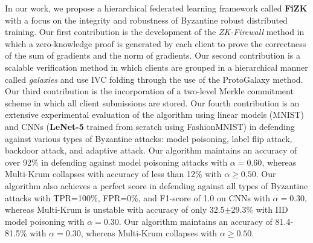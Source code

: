 \documentclass[10pt,twocolumn,letterpaper]{article}
\begin{document}
In our work, we propose a hierarchical federated learning framework called \textbf{FiZK} with a focus on the integrity and robustness of Byzantine robust distributed training. Our first contribution is the development of the \textit{ZK-Firewall} method in which a zero-knowledge proof is generated by each client to prove the correctness of the sum of gradients and the norm of gradients. Our second contribution is a scalable verification method in which clients are grouped in a hierarchical manner called \textit{galaxies} and use IVC folding through the use of the ProtoGalaxy method. Our third contribution is the incorporation of a two-level Merkle commitment scheme in which all client submissions are stored. Our fourth contribution is an extensive experimental evaluation of the algorithm using linear models (MNIST) and CNNs (\textbf{LeNet-5} trained from scratch using FashionMNIST) in defending against various types of Byzantine attacks: model poisoning, label flip attack, backdoor attack, and adaptive attack. Our algorithm maintains an accuracy of over 92\% in defending against model poisoning attacks with $\alpha=0.60$, whereas Multi-Krum collapses with accuracy of less than 12\% with $\alpha\geq0.50$. Our algorithm also achieves a perfect score in defending against all types of Byzantine attacks with TPR=100\%, FPR=0\%, and F1-score of 1.0 on CNNs with $\alpha=0.30$, whereas Multi-Krum is unstable with accuracy of only 32.5$\pm$29.3\% with IID model poisoning with $\alpha=0.30$. Our algorithm maintains an accuracy of 81.4-81.5\% with $\alpha=0.30$, whereas Multi-Krum collapses with $\alpha\geq0.50$.
\end{document}
